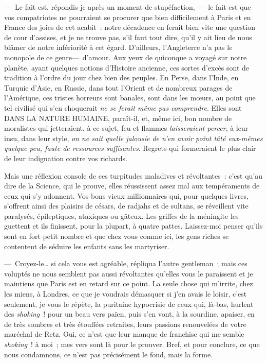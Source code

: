 \documentclass[french,twoside]{book} %
\begin{document}
— Le fait est, répondis-je après un moment de stupéfaction, — le fait est que vos compatriotes ne pourraient se procurer que bien difficilement à Paris et en France des joies de cet   acabit : notre décadence en ferait bien vite une question de cour d’assises, et je ne trouve pas, s’il faut tout dire, qu’il y ait lieu de nous blâmer de notre infériorité à cet égard. D’ailleurs, l’Angleterre n’a pas le monopole de ce genre— d’amour. Aux yeux de quiconque a voyagé sur notre planète, ayant quelques notions d’Histoire ancienne, ces sortes d’excès sont de tradition à l’ordre du jour chez bien des peuples. En Perse, dans l’Inde, en Turquie d’Asie, en Russie, dans tout l’Orient et de nombreux parages de l’Amérique, ces tristes horreurs sont banales, sont dans les mœurs, au point que tel civilisé qui s’en choquerait \emph{ne se ferait même pas comprendre}. Elles sont DANS LA NATURE HUMAINE, paraît-il, et, même ici, bon nombre de moralistes qui jetteraient, à ce sujet, feu et flammes \emph{laisseraient percer}, à leur insu, dans leur style, \emph{on ne sait quelle jalousie de n’en avoir point tâté eux-mêmes quelque peu, faute de ressources suffisantes}. Regrets qui formeraient le plus clair de leur indignation contre vos richards.\par
Mais une réflexion console de ces turpitudes   maladives et révoltantes : c’est qu’au dire de la Science, qui le prouve, elles réussissent assez mal aux tempéraments de ceux qui s’y adonnent. Vos bons vieux millionnaires qui, pour quelques livres, s’offrent ainsi des plaisirs de césars, de radjahs et de sultans, se réveillent vite paralysés, épileptiques, ataxiques ou gâteux. Les griffes de la méningite les guettent et ils finissent, pour la plupart, à quatre pattes. Laissez-moi penser qu’ils sont en fort petit nombre et que chez vous comme ici, les gens riches se contentent de séduire les enfants sans les martyriser.\par
— Croyez-le… si cela vous est agréable, répliqua l’autre gentleman ; mais ces voluptés ne nous semblent pas aussi révoltantes qu’elles vous le paraissent et je maintiens que Paris est en retard sur ce point. La seule chose qui m’irrite, chez les miens, à Londres, ce que je voudrais démasquer si j’en avais le loisir, c’est seulement, je vous le répète, la puritaine hypocrisie de ceux qui, là-bas, hurlent des \emph{shoking} ! pour un beau vers païen, puis s’en vont,   à la sourdine, apaiser, en de très sombres et très étouffées retraites, leurs passions renouvelées de votre maréchal de Retz. Oui, ce n’est que leur manque de franchise qui me semble \emph{shoking} ! à moi ; mes vers sont là pour le prouver. Bref, et pour conclure, ce que nous condamnons, ce n’est pas précisément le fond, mais la forme.\par
\end{document}
